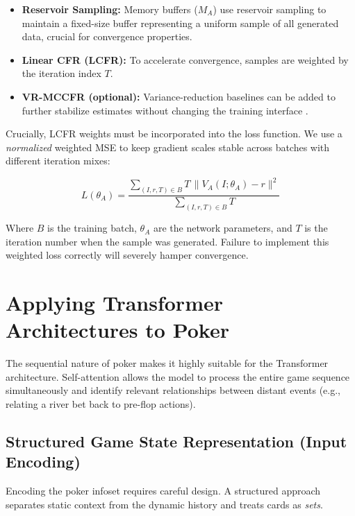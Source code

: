 \documentclass[11pt,a4paper]{article}
\begin{document}
\begin{itemize}
    \item \textbf{Reservoir Sampling:} Memory buffers ($M_A$) use reservoir sampling to maintain a fixed-size buffer representing a uniform sample of all generated data, crucial for convergence properties.
    \item \textbf{Linear CFR (LCFR):} To accelerate convergence, samples are weighted by the iteration index $T$.
    \item \textbf{VR-MCCFR (optional):} Variance-reduction baselines can be added to further stabilize estimates without changing the training interface \cite{schmid2018vrmccfr}.
\end{itemize}

Crucially, LCFR weights must be incorporated into the loss function. We use a \emph{normalized} weighted MSE to keep gradient scales stable across batches with different iteration mixes:

\begin{equation}
L(\theta_A) = \frac{\sum_{(I, r, T) \in B} T \,\big\| V_A(I;\theta_A) - r \big\|^2}{\sum_{(I, r, T) \in B} T}
\end{equation}

Where $B$ is the training batch, $\theta_A$ are the network parameters, and $T$ is the iteration number when the sample was generated. Failure to implement this weighted loss correctly will severely hamper convergence.

\section{Applying Transformer Architectures to Poker}

The sequential nature of poker makes it highly suitable for the Transformer architecture. Self-attention allows the model to process the entire game sequence simultaneously and identify relevant relationships between distant events (e.g., relating a river bet back to pre-flop actions).

\subsection{Structured Game State Representation (Input Encoding)}

Encoding the poker infoset requires careful design. A structured approach separates static context from the dynamic history and treats cards as \emph{sets}.
\end{document}
